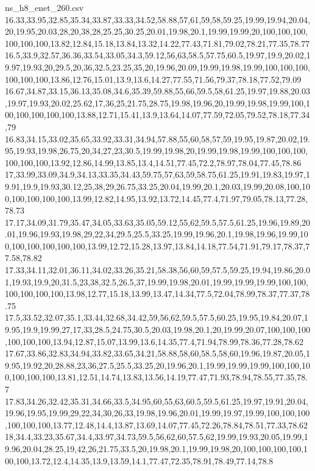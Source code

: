 \begin{filecontents*}[overwrite]{ns_h8_enet_260.csv}
16.33,33.95,32.85,35.34,33.87,33.33,34.52,58.88,57,61,59,58,59.25,19.99,19.94,20.04,20,19.95,20.03,28,20,38,28,25.25,30.25,20.01,19.98,20.1,19.99,19.99,20,100,100,100,100,100,100,13.82,12.84,15.18,13.84,13.32,14.22,77.43,71.81,79.02,78.21,77.35,78.77
16.5,33.9,32.57,36.36,33.54,33.05,34.3,59.12,56,63,58.5,57.75,60.5,19.97,19.9,20.02,19.97,19.93,20,29.5,20,36,32.5,23.25,35,20,19.96,20.09,19.99,19.98,19.99,100,100,100,100,100,100,13.86,12.76,15.01,13.9,13.6,14.27,77.55,71.56,79.37,78.18,77.52,79.09
16.67,34.87,33.15,36.13,35.08,34.6,35.39,59.88,55,66,59.5,58,61.25,19.97,19.88,20.03,19.97,19.93,20.02,25.62,17,36,25,21.75,28.75,19.98,19.96,20,19.99,19.98,19.99,100,100,100,100,100,100,13.88,12.71,15.41,13.9,13.64,14.07,77.59,72.05,79.52,78.18,77.34,79
16.83,34.15,33.02,35.65,33.92,33.31,34.94,57.88,55,60,58,57,59,19.95,19.87,20.02,19.95,19.93,19.98,26.75,20,34,27,23,30.5,19.99,19.98,20,19.99,19.98,19.99,100,100,100,100,100,100,13.92,12.86,14.99,13.85,13.4,14.51,77.45,72.2,78.97,78.04,77.45,78.86
17,33.99,33.09,34.9,34.13,33.35,34.43,59.75,57,63,59,58.75,61.25,19.91,19.83,19.97,19.91,19.9,19.93,30.12,25,38,29,26.75,33.25,20.04,19.99,20.1,20.03,19.99,20.08,100,100,100,100,100,100,13.99,12.82,14.95,13.92,13.72,14.45,77.4,71.97,79.05,78.13,77.28,78.73
17.17,34.09,31.79,35.47,34.05,33.63,35.05,59.12,55,62,59.5,57.5,61.25,19.96,19.89,20.01,19.96,19.93,19.98,29,22,34,29.5,25.5,33.25,19.99,19.96,20.1,19.98,19.96,19.99,100,100,100,100,100,100,13.99,12.72,15.28,13.97,13.84,14.18,77.54,71.91,79.17,78.37,77.58,78.82
17.33,34.11,32.01,36.11,34.02,33.26,35.21,58.38,56,60,59,57.5,59.25,19.94,19.86,20.01,19.93,19.9,20,31.5,23,38,32.5,26.5,37,19.99,19.98,20.01,19.99,19.99,19.99,100,100,100,100,100,100,13.98,12.77,15.18,13.99,13.47,14.34,77.5,72.04,78.99,78.37,77.37,78.75
17.5,33.52,32.07,35.1,33.44,32.68,34.42,59,56,62,59.5,57.5,60.25,19.95,19.84,20.07,19.95,19.9,19.99,27,17,33,28.5,24.75,30.5,20.03,19.98,20.1,20,19.99,20.07,100,100,100,100,100,100,13.94,12.87,15.07,13.99,13.6,14.35,77.4,71.94,78.99,78.36,77.28,78.62
17.67,33.86,32.83,34.94,33.82,33.65,34.21,58.88,58,60,58.5,58,60,19.96,19.87,20.05,19.95,19.92,20,28.88,23,36,27.5,25.5,33.25,20,19.96,20.1,19.99,19.99,19.99,100,100,100,100,100,100,13.81,12.51,14.74,13.83,13.56,14.19,77.47,71.93,78.94,78.55,77.35,78.7
17.83,34.26,32.42,35.31,34.66,33.5,34.95,60,55,63,60.5,59.5,61.25,19.97,19.91,20.04,19.96,19.95,19.99,29,22,34,30,26,33,19.98,19.96,20.01,19.99,19.97,19.99,100,100,100,100,100,100,13.77,12.48,14.4,13.87,13.69,14.07,77.45,72.26,78.84,78.51,77.33,78.62
18,34.4,33.23,35.67,34.4,33.97,34.73,59.5,56,62,60,57.5,62,19.99,19.93,20.05,19.99,19.96,20.04,28.25,19,42,26,21.75,33.5,20,19.98,20.1,19.99,19.98,20,100,100,100,100,100,100,13.72,12.4,14.35,13.9,13.59,14.1,77.47,72.35,78.91,78.49,77.14,78.8

\end{filecontents*}
